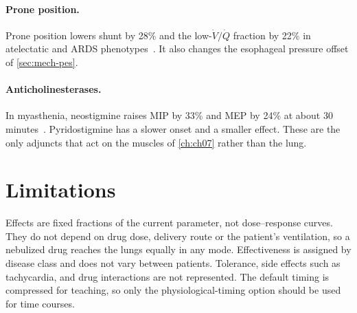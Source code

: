 \paragraph{Prone position.} Prone position lowers shunt by 28\% and the low-$\dot V/\dot Q$ fraction by 22\% in atelectatic and ARDS phenotypes~\citep{guerin2013}. It also changes the esophageal pressure offset of \cref{sec:mech-pes}.

\paragraph{Anticholinesterases.} In myasthenia, neostigmine raises MIP by 33\% and MEP by 24\% at about 30 minutes~\citep{radwan1988}. Pyridostigmine has a slower onset and a smaller effect. These are the only adjuncts that act on the muscles of \cref{ch:ch07} rather than the lung.

\section{Limitations}
Effects are fixed fractions of the current parameter, not dose--response curves. They do not depend on drug dose, delivery route or the patient's ventilation, so a nebulized drug reaches the lungs equally in any mode. Effectiveness is assigned by disease class and does not vary between patients. Tolerance, side effects such as tachycardia, and drug interactions are not represented. The default timing is compressed for teaching, so only the physiological-timing option should be used for time courses.
